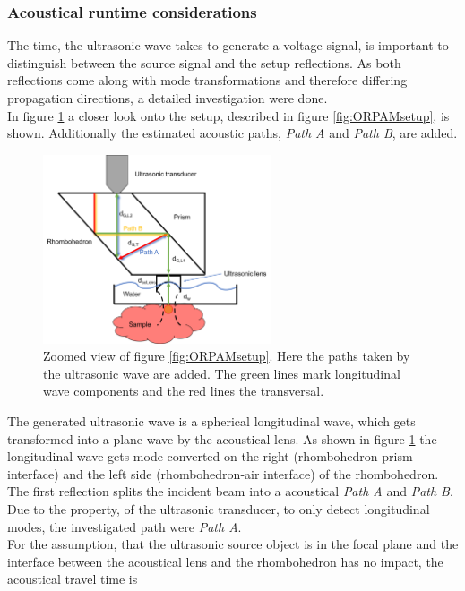 \subsubsection{Acoustical runtime considerations}

The time, the ultrasonic wave takes to generate a voltage signal, is important to distinguish between the source signal and the setup reflections. As both reflections come along with mode transformations and therefore differing propagation directions, a detailed investigation were done.\\
In figure \ref{fig:acousticalPath} a closer look onto the setup, described in figure \ref{fig:ORPAMsetup}, is shown. Additionally the estimated acoustic paths, \textit{Path A} and \textit{Path B}, are added.

\begin{figure}[H]
	\centering
	\includegraphics[height = 0.35\textheight, width = 0.6\textwidth]{02_principles_of_photoacoustics/images/ultrasonicPath.png}
	\caption{Zoomed view of figure \ref{fig:ORPAMsetup}. Here the paths taken by the ultrasonic wave are added. The green lines mark longitudinal wave components and the red lines the transversal.}
	\label{fig:acousticalPath}
\end{figure}

The generated ultrasonic wave is a spherical longitudinal wave, which gets transformed into a plane wave by the acoustical lens. As shown in figure \ref{fig:acousticalPath} the longitudinal wave gets mode converted on the right (rhombohedron-prism interface) and the left side (rhombohedron-air interface) of the rhombohedron. The first reflection splits the incident beam into a acoustical \textit{Path A} and \textit{Path B}. Due to the property, of the ultrasonic transducer, to only detect longitudinal modes, the investigated path were \textit{Path A}.\\
For the assumption, that the ultrasonic source object is in the focal plane and the interface between the acoustical lens and the rhombohedron has no impact, the acoustical travel time is 

